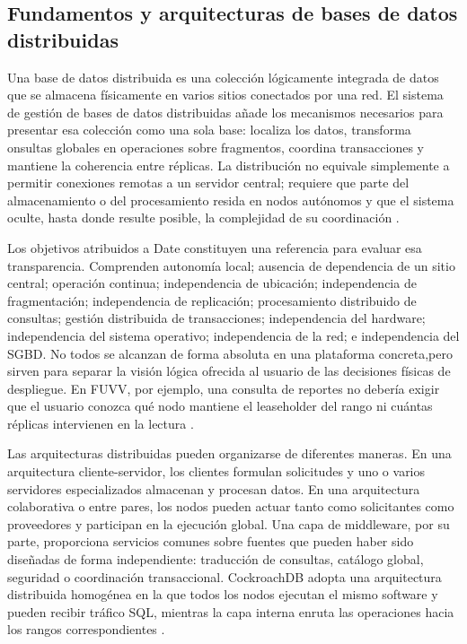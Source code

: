 \documentclass[12pt,a4paper]{article}
\begin{document}
\subsection{Fundamentos y arquitecturas de bases de datos distribuidas}
\label{subsec:fundamentos-bdd}

Una base de datos distribuida es una colección lógicamente integrada de datos que se almacena físicamente en varios sitios conectados por una red. El sistema de gestión de bases de datos distribuidas añade los mecanismos necesarios para presentar esa colección como una sola base: localiza los datos, transforma onsultas globales en operaciones sobre fragmentos, coordina transacciones y mantiene la coherencia entre réplicas. La distribución no equivale simplemente a permitir conexiones remotas a un servidor central; requiere que parte del almacenamiento o del procesamiento resida en nodos autónomos y que el sistema oculte, hasta donde resulte posible, la complejidad de su coordinación \cite{ozsu2020distributed,kleppmann2017ddia}.

Los objetivos atribuidos a Date constituyen una referencia para evaluar esa transparencia. Comprenden autonomía local; ausencia de dependencia de un sitio central; operación continua; independencia de ubicación; independencia de fragmentación; independencia de replicación; procesamiento distribuido de consultas; gestión distribuida de transacciones; independencia del hardware; independencia del sistema operativo; independencia de la red; e independencia del SGBD. No todos se alcanzan de forma absoluta en una plataforma concreta,pero sirven para separar la visión lógica ofrecida al usuario de las decisiones físicas de despliegue. En FUVV, por ejemplo, una consulta de reportes no debería exigir que el usuario conozca qué nodo mantiene el leaseholder del rango ni cuántas réplicas intervienen en la lectura \cite{ozsu2020distributed,taft2020cockroachdb}.

Las arquitecturas distribuidas pueden organizarse de diferentes maneras. En una arquitectura cliente-servidor, los clientes formulan solicitudes y uno o varios servidores especializados almacenan y procesan datos. En una arquitectura colaborativa o entre pares, los nodos pueden actuar tanto como solicitantes como proveedores y participan en la ejecución global. Una capa de middleware, por su parte, proporciona servicios comunes sobre fuentes que pueden haber sido diseñadas de forma independiente: traducción de consultas, catálogo global, seguridad o coordinación transaccional. CockroachDB adopta una arquitectura distribuida homogénea en la que todos los nodos ejecutan el mismo software y pueden recibir tráfico SQL, mientras la capa interna enruta las operaciones hacia los rangos correspondientes \cite{taft2020cockroachdb,vanbenschoten2022multiregion}.
\end{document}
